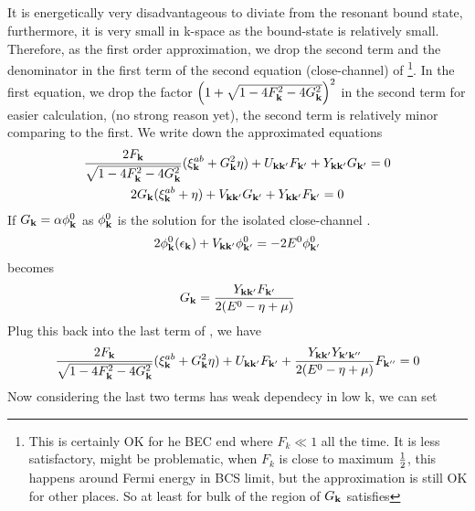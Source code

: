 \subsection{}
It is energetically very disadvantageous to diviate from the resonant bound state, furthermore, it is very small in k-space as the bound-state is relatively small.  Therefore, as the first order approximation, we drop the second term and the denominator in the first term of the second equation (close-channel) of \footnote{ This is certainly OK for he BEC end where $F_{k}\ll1$ all the time.  It is less satisfactory, might be problematic,  when $F_{k}$ is close to maximum $\frac{1}{2}$, this happens around Fermi energy in BCS limit, but the approximation is still OK for other places. So at least for bulk of the region of $G_{\mathbf{k}}$ satisfies }.  In the first equation, we drop the factor $\left(1+\sqrt{1-4 F_{\mathbf{k}}^2-4 G_{\mathbf{k}}^2}\right)^2$ in the second term for easier calculation, (no strong reason yet), the second term is relatively minor comparing to the first. We write down the approximated equations
\begin{subequations}\label{eq:20100915:gap}
\begin{gather}\label{eq:20100915:gapa}
\frac{2F_{\mathbf{k}}}{\sqrt{1-4 F_{\mathbf{k}}^2-4 G_{\mathbf{k}}^2}} (\xi^{ab}_{\mathbf{k}}+  G_{\mathbf{k}}^2\eta)+U_{\mathbf{k}\mathbf{k}'}F_{\mathbf{k}'}+Y_{\mathbf{k}\mathbf{k}'}G_{\mathbf{k}'}=0\\
\label{eq:20100915:gapb}
{2G_{\ensuremath{\mathbf{k}}}}(\xi^{ab}_{\mathbf{k}}+\eta)+V_{\mathbf{k}\mathbf{k}'}G_{\mathbf{k}'}+Y_{\mathbf{k}\mathbf{k}'}F_{\mathbf{k}'}=0
\end{gather}
\end{subequations}
If $G_{\mathbf{k}}=\alpha\phi^{0}_{\mathbf{k}}$ as $\phi_{\mathbf{k}}^{0}$ is the solution for the isolated close-channel \sch.  
\begin{equation}\label{eq:20100915:twobody}
{2\phi^{0}_{\ensuremath{\mathbf{k}}}}(\epsilon_{\mathbf{k}})+V_{\mathbf{k}\mathbf{k}'}\phi^{0}_{\mathbf{k}'}=-2E^{0}\phi^{0}_{\mathbf{k}'}
\end{equation}
 becomes
\begin{equation}
G_{\mathbf{k}}=\frac{Y_{\mathbf{k}\mathbf{k}'}F_{\mathbf{k}'}}{2(E^{0}-\eta+\mu)}
\end{equation}
Plug this back into the last term of , we have 
\begin{equation}
\frac{2F_{\mathbf{k}}}{\sqrt{1-4 F_{\mathbf{k}}^2-4 G_{\mathbf{k}}^2}} (\xi^{ab}_{\mathbf{k}}+  G_{\mathbf{k}}^2\eta)+U_{\mathbf{k}\mathbf{k}'}F_{\mathbf{k}'}+\frac{Y_{\mathbf{k}\mathbf{k}'}Y_{\mathbf{k}'\mathbf{k}''}}{2(E^{0}-\eta+\mu)}F_{\mathbf{k}''}=0
\end{equation}
Now considering the last two terms has weak dependecy in low k, we can set 
